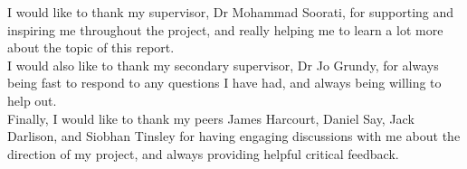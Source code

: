 \documentclass[letterpaper, 10 pt, conference]{ieeeconf}  %
\begin{document}
I would like to thank my supervisor, Dr Mohammad Soorati, for supporting and inspiring me throughout the project, and really helping me to learn a lot more about the topic of this report.\\

I would also like to thank my secondary supervisor, Dr Jo Grundy, for always being fast to respond to any questions I have had, and always being willing to help out.\\

Finally, I would like to thank my peers James Harcourt, Daniel Say, Jack Darlison, and Siobhan Tinsley for having engaging discussions with me about the direction of my project, and always providing helpful critical feedback.






{}
\end{document}
